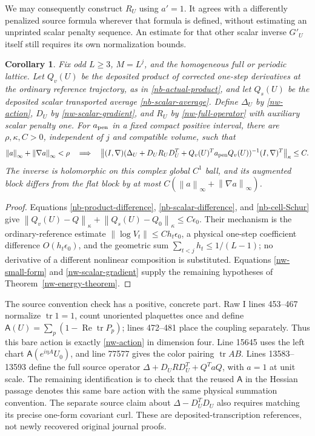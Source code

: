 \documentclass[11pt]{article}
\newtheorem{corollary}[theorem]{Corollary}
\theoremstyle{remark}
\newcommand{\norm}[1]{\left\|#1\right\|}
\begin{document}
We may consequently construct $R_U$ using $a'=1$.
It agrees with a differently penalized source formula wherever
that formula is defined, without estimating an unprinted scalar
penalty sequence. An estimate for that other scalar inverse
$G'_U$ itself still requires its own normalization bounds.

\begin{corollary}\label{nw-wilson-corollary}
Fix odd $L\ge3$, $M=L^j$, and the homogeneous full or periodic
lattice. Let $Q_v(U)$ be the deposited product of corrected
one-step derivatives at the ordinary reference trajectory, as
in \eqref{nb-actual-product}, and let $Q_s(U)$ be the deposited
scalar transported average \eqref{nb-scalar-average}.
Define $\Delta_U$ by \eqref{nw-action}, $D_U$ by
\eqref{nw-scalar-gradient}, and $R_U$ by
\eqref{nw-full-operator} with auxiliary scalar penalty one.
For $a_{\rm pen}$ in a fixed compact positive interval, there are
$\rho,\kappa,C>0$, independent of $j$ and compatible volume, such that
\begin{equation}\label{nw-final}
 \norm{a}_\infty+\norm{\nabla a}_\infty<\rho
 \quad\Longrightarrow\quad
 \norm{(I,\nabla)
 (\Delta_U+D_UR_UD_U^T+Q_v(U)^Ta_{\rm pen}Q_v(U))^{-1}
 (I,\nabla)^T}_\kappa\le C.
\end{equation}
The inverse is holomorphic on this complex global $C^1$ ball,
and its augmented block differs from the flat block by at most
$C(\norm{a}_\infty+\norm{\nabla a}_\infty)$.
\end{corollary}

\begin{proof}
Equations \eqref{nb-product-difference},
\eqref{nb-scalar-difference}, and \eqref{nb-cell-Schur}
give $\norm{Q_v(U)-Q}_\kappa+\norm{Q_s(U)-Q_0}_\kappa
\le C\epsilon_0$.
Their mechanism is the ordinary-reference estimate
$\norm{\log V_t}\le Ch_t\epsilon_0$, a physical one-step
coefficient difference $O(h_t\epsilon_0)$, and the geometric
sum $\sum_{t<j}h_t\le1/(L-1)$; no derivative of a different
nonlinear composition is substituted.
Equations \eqref{nw-small-form} and \eqref{nw-scalar-gradient}
supply the remaining hypotheses of Theorem~\ref{nw-energy-theorem}.
\end{proof}

The source convention check has a positive, concrete part.
Raw I lines 453--467 normalize $\operatorname{tr}1=1$, count
unoriented plaquettes once and define
$\mathsf A(U)=\sum_p(1-\operatorname{Re}\operatorname{tr}P_p)$;
lines 472--481 place the coupling separately. Thus this bare action
is exactly \eqref{nw-action} in dimension four.
Line 15645 uses the left chart $\mathsf A(e^{i\eta A}U_0)$,
and line 77577 gives the color pairing $\operatorname{tr}AB$.
Lines 13583--13593 define the full source operator
$\Delta+D_URD_U^T+Q^TaQ$, with $a=1$ at unit scale.
The remaining identification is to check that the reused
$\mathsf A$ in the Hessian passage denotes this same bare action
with the same physical summation convention. The separate source
claim about $\Delta-D_U^TD_U$ also requires matching its precise
one-form covariant curl. These are deposited-transcription
references, not newly recovered original journal proofs.
\end{document}
